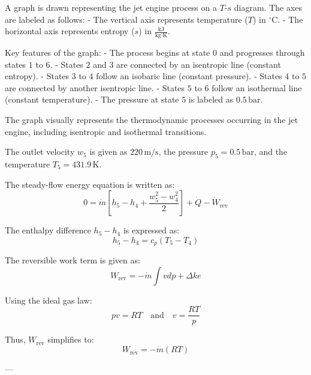 A graph is drawn representing the jet engine process on a \( T \)-\( s \) diagram. The axes are labeled as follows:  
- The vertical axis represents temperature (\( T \)) in \( ^\circ\text{C} \).  
- The horizontal axis represents entropy (\( s \)) in \( \frac{\text{kJ}}{\text{kg·K}} \).  

Key features of the graph:  
- The process begins at state \( 0 \) and progresses through states \( 1 \) to \( 6 \).  
- States \( 2 \) and \( 3 \) are connected by an isentropic line (constant entropy).  
- States \( 3 \) to \( 4 \) follow an isobaric line (constant pressure).  
- States \( 4 \) to \( 5 \) are connected by another isentropic line.  
- States \( 5 \) to \( 6 \) follow an isothermal line (constant temperature).  
- The pressure at state \( 5 \) is labeled as \( 0.5 \, \text{bar} \).  

The graph visually represents the thermodynamic processes occurring in the jet engine, including isentropic and isothermal transitions.

The outlet velocity \( w_5 \) is given as \( 220 \, \text{m/s} \), the pressure \( p_5 = 0.5 \, \text{bar} \), and the temperature \( T_5 = 431.9 \, \text{K} \).  

The steady-flow energy equation is written as:  
\[
0 = \dot{m} \left[ h_5 - h_4 + \frac{w_5^2 - w_4^2}{2} \right] + \dot{Q} - \dot{W}_{\text{rev}}
\]  

The enthalpy difference \( h_5 - h_4 \) is expressed as:  
\[
h_5 - h_4 = c_p (T_5 - T_4)
\]  

The reversible work term is given as:  
\[
W_{\text{rev}} = -\dot{m} \int v dp + \Delta ke
\]  

Using the ideal gas law:  
\[
pv = RT \quad \text{and} \quad v = \frac{RT}{p}
\]  

Thus, \( W_{\text{rev}} \) simplifies to:  
\[
W_{\text{rev}} = -\dot{m} (RT)
\]  

---